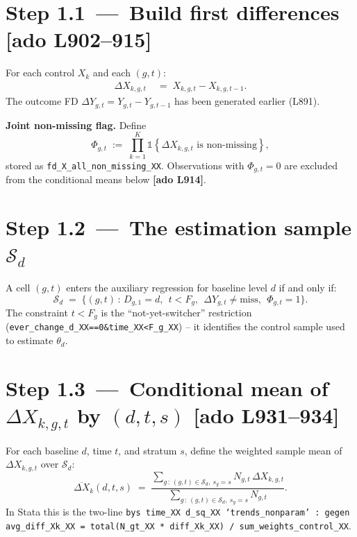 \documentclass[11pt]{article}
\newcommand{\code}[1]{\texttt{\small #1}}
\newcommand{\Adoref}[1]{\textcolor{accent}{\footnotesize\textbf{[ado L#1]}}}
\newcommand{\1}{\mathbb{1}}
\newcommand{\Smpl}{\mathcal{S}}
\newcommand{\Ngt}{N_{g,t}}
\newcommand{\dY}{\Delta Y_{g,t}}
\newcommand{\dXk}{\Delta X_{k,g,t}}
\newcommand{\dXbar}{\overline{\Delta X}}
\begin{document}
\section[Step 1.1 -- Build first differences (L902--915)]{Step 1.1 \,---\, Build first differences \Adoref{902--915}}

For each control $X_k$ and each $(g,t)$:
\begin{align}
\dXk &\;=\; X_{k,g,t} - X_{k,g,t-1}.
\label{eq:fdX}
\end{align}
The outcome FD $\dY = Y_{g,t} - Y_{g,t-1}$ has been generated earlier (L891).

\medskip\noindent\textbf{Joint non-missing flag.} Define
\begin{equation}
\Phi_{g,t} \;:=\; \prod_{k=1}^{K} \1\!\left\{\dXk \text{ is non-missing}\right\},
\label{eq:phi}
\end{equation}
stored as \code{fd\_X\_all\_non\_missing\_XX}. Observations with $\Phi_{g,t}=0$
are excluded from the conditional means below \Adoref{914}.

\section[Step 1.2 -- The estimation sample S_d]{Step 1.2 \,---\, The estimation sample $\Smpl_d$}

A cell $(g,t)$ enters the auxiliary regression for baseline level $d$ if and
only if:
\begin{equation}
\Smpl_d \;=\; \big\{(g,t)\,:\, D_{g,1} = d,\ \ t < F_g,\ \ \dY \ne \text{miss},\ \ \Phi_{g,t} = 1 \big\}.
\label{eq:sample}
\end{equation}
The constraint $t < F_g$ is the ``not-yet-switcher'' restriction
(\code{ever\_change\_d\_XX==0\&time\_XX<F\_g\_XX}) -- it identifies the
control sample used to estimate $\theta_d$.

\section[Step 1.3 -- Conditional mean of Delta X_k by (d,t,s) (L931--934)]{Step 1.3 \,---\, Conditional mean of $\dXk$ by $(d,t,s)$ \Adoref{931--934}}

For each baseline $d$, time $t$, and stratum $s$, define the
weighted sample mean of $\dXk$ over $\Smpl_d$:
\begin{equation}
\dXbar_k(d, t, s)
\;=\;
\dfrac{
  \displaystyle\sum_{g\,:\,(g,t)\in\Smpl_d,\ s_g = s} \Ngt \,\dXk
}{
  \displaystyle\sum_{g\,:\,(g,t)\in\Smpl_d,\ s_g = s} \Ngt
}.
\label{eq:dXbar}
\end{equation}
In Stata this is the two-line \code{bys time\_XX d\_sq\_XX `trends\_nonparam'
: gegen avg\_diff\_X{k}\_XX = total(N\_gt\_XX * diff\_X{k}\_XX) / sum\_weights\_control\_XX}.
\end{document}
